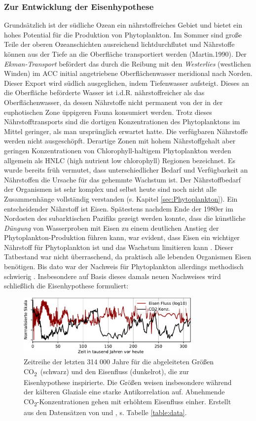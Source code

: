\documentclass[12pt,a4paper,onecolumn]{scrartcl}
\newcommand{\cotwo}{CO\textsubscript{2}}
\begin{document}
\subsubsection{Zur Entwicklung der Eisenhypothese}
Grundsätzlich ist der südliche Ozean ein nährstoffreiches Gebiet und
bietet ein hohes Potential für die Produktion von Phytoplankton. Im Sommer sind große Teile der oberen Ozeanschichten ausreichend lichtdurchflutet und Nährstoffe können aus der Tiefe an die Oberfläche transportiert werden (Martin.1990). Der \textit{Ekman-Transport} befördert das durch die Reibung mit den \textit{Westerlies} (westlichen Winden) im ACC initial angetriebene Oberflächenwasser meridional nach Norden. Dieser Export wird südlich ausgeglichen, indem Tiefenwasser aufsteigt. Dieses an die Oberfläche beförderte Wasser ist i.d.R. nährstoffreicher als das Oberflächenwasser, da dessen Nährstoffe nicht permanent von der in der euphotischen Zone üppigeren Fauna konsumiert werden. Trotz dieses Nährstofftransports sind die dortigen Konzentrationen des Phytoplanktons im Mittel geringer, als man ursprünglich erwartet hatte. Die verfügbaren Nährstoffe werden nicht ausgeschöpft. Derartige Zonen mit hohem Nährstoffgehalt aber geringen Konzentrationen von Chlorophyll-haltigem Phytoplankton werden allgemein als HNLC (high nutrient low chlorophyll) Regionen bezeichnet. Es wurde bereits früh vermutet, dass unterschiedlicher Bedarf und Verfügbarkeit an Nährstoffen die Ursache für das gehemmte Wachstum ist. Der Nährstoffbedarf der Organismen ist sehr komplex und selbst heute sind noch nicht alle Zusammenhänge vollständig verstanden (s. Kapitel \ref{sec:Phytoplankton}). Ein entscheidender Nährstoff ist Eisen. Spätestens nachdem Ende der 1980er im Nordosten des subarktischen Pazifiks gezeigt werden konnte, dass die künstliche \textit{Düngung} von Wasserproben mit Eisen zu einem deutlichen Anstieg der Phytoplankton-Produktion führen kann, war evident, dass Eisen ein wichtiger Nährstoff für Phytoplankton ist und das Wachstum limitieren kann \citep{Martin.1988}. Dieser Tatbestand war nicht überraschend, da praktisch alle lebenden Organismen Eisen benötigen. Bis dato war der Nachweis für Phytoplankton allerdings methodisch schwierig \citep{Martin.1988}. Insbesondere auf Basis dieses damals neuen Nachweises wird schließlich die Eisenhypothese formuliert:
\begin{figure}[!htb]
\centering
\includegraphics[width=0.8\textwidth]{bilder/co2_iron.pdf}
\caption{Zeitreihe der letzten 314 000 Jahre für die abgeleiteten Größen \cotwo \ (schwarz) und den Eisenfluss (dunkelrot), die zur Eisenhypothese inspirierte. Die Größen weisen insbesondere während der kälteren Glaziale eine starke Antikorrelation auf. Abnehmende \cotwo -Konzentrationen gehen mit erhöhtem Eisenfluss einher. Erstellt aus den Datensätzen von \cite{Bereiter.2015} und \cite{Vallelonga.2013}, s. Tabelle \ref{table:data}.}   \label{fig:co2iron}
\end{figure}
\end{document}

